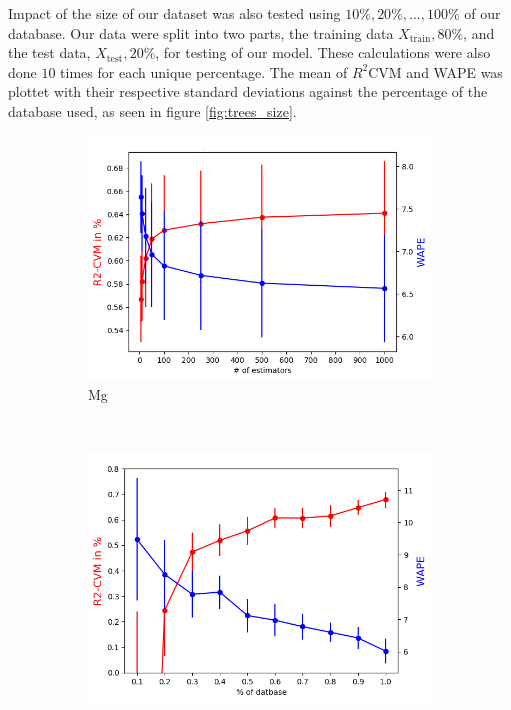 Impact of the size of our dataset was also tested using $10\%,20\%,...,100\%$ of our database. Our data were split into two parts, the training data $X_{\text{train}}, 80\%$, and the test data, $X_{\text{test}},20\%$, for testing of our model. These calculations were also done $10$ times for each unique percentage. The mean of $R^2$CVM and WAPE was plottet with their respective standard deviations against the percentage of the database used, as seen in figure \ref{fig:trees_size}. 

\begin{figure}[H]
    \centering
    \begin{subfigure}{0.45\textwidth}
        \centering
        \includegraphics[width=\linewidth]{result/Mg_n_estimators.png}
        \caption{Mg}
        \label{fig:n_estimators}
    \end{subfigure}%
    ~ 
        \begin{subfigure}{0.45\textwidth}
        \centering
        \includegraphics[width=\linewidth]{result/Mg_size_db.png}

\end{subfigure}
\end{figure}
